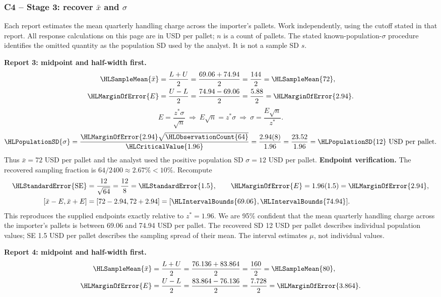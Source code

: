 \subsubsection*{C4 -- Stage 3: recover $\bar x$ and $\sigma$}\label{sol:c4-2-c}
Each report estimates the mean quarterly handling charge across the importer's pallets. Work independently, using the cutoff stated in that report. All response calculations on this page are in USD per pallet; $n$ is a count of pallets.
The stated known-population-$\sigma$ procedure identifies the omitted quantity as the population SD used by the analyst. It is not a sample SD $s$.
\par\noindent\textbf{Report 3: midpoint and half-width first.}
\[\begin{aligned}
\HLSampleMean{\bar x}&=\frac{L+U}{2}=\frac{69.06+74.94}{2}=\frac{144}{2}=\HLSampleMean{72},\\
\HLMarginOfError{E}&=\frac{U-L}{2}=\frac{74.94-69.06}{2}=\frac{5.88}{2}=\HLMarginOfError{2.94}.
\end{aligned}\]
\[E=\frac{z^*\sigma}{\sqrt n}\ \Longrightarrow\ E\sqrt n=z^*\sigma\ \Longrightarrow\ \sigma=\frac{E\sqrt n}{z^*}.\]
\[\HLPopulationSD{\sigma}=\frac{\HLMarginOfError{2.94}\sqrt{\HLObservationCount{64}}}{\HLCriticalValue{1.96}}=\frac{2.94(8)}{1.96}=\frac{23.52}{1.96}=\HLPopulationSD{12}\text{ USD per pallet}.\]
Thus $\bar x=72$ USD per pallet and the analyst used the positive population SD $\sigma=12$ USD per pallet.
\textbf{Endpoint verification.} The recovered sampling fraction is $64/2400\approx 2.67\%<10\%$. Recompute
\[\begin{aligned}
\HLStandardError{\mathrm{SE}}&=\frac{12}{\sqrt{64}}=\frac{12}{8}=\HLStandardError{1.5},\qquad \HLMarginOfError{E}=1.96(1.5)=\HLMarginOfError{2.94},\\
[\bar x-E,\bar x+E]&=[72-2.94,72+2.94]=[\HLIntervalBounds{69.06},\HLIntervalBounds{74.94}].
\end{aligned}\]
This reproduces the supplied endpoints exactly relative to $z^*=1.96$. We are 95\% confident that the mean quarterly handling charge across the importer's pallets is between 69.06 and 74.94 USD per pallet.
The recovered SD 12 USD per pallet describes individual population values; SE 1.5 USD per pallet describes the sampling spread of their mean. The interval estimates $\mu$, not individual values.
\par\noindent\textbf{Report 4: midpoint and half-width first.}
\[\begin{aligned}
\HLSampleMean{\bar x}&=\frac{L+U}{2}=\frac{76.136+83.864}{2}=\frac{160}{2}=\HLSampleMean{80},\\
\HLMarginOfError{E}&=\frac{U-L}{2}=\frac{83.864-76.136}{2}=\frac{7.728}{2}=\HLMarginOfError{3.864}.
\end{aligned}\]
